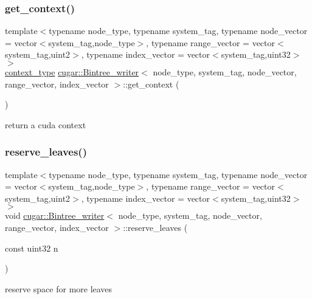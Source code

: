 \subsubsection{\texorpdfstring{get\+\_\+context()}{get\_context()}}
{\footnotesize\ttfamily template$<$typename node\+\_\+type, typename system\+\_\+tag, typename node\+\_\+vector = vector$<$system\+\_\+tag,node\+\_\+type$>$, typename range\+\_\+vector = vector$<$system\+\_\+tag,uint2$>$, typename index\+\_\+vector = vector$<$system\+\_\+tag,uint32$>$$>$ \\
\hyperlink{structcugar_1_1_bintree__writer__context}{context\+\_\+type} \hyperlink{structcugar_1_1_bintree__writer}{cugar\+::\+Bintree\+\_\+writer}$<$ node\+\_\+type, system\+\_\+tag, node\+\_\+vector, range\+\_\+vector, index\+\_\+vector $>$\+::get\+\_\+context (\begin{DoxyParamCaption}{ }\end{DoxyParamCaption})\hspace{0.3cm}{\ttfamily [inline]}}

return a cuda context \mbox{\label{structcugar_1_1_bintree__writer_aaff80118d0d6e4cc98e8decfedecd332}} 
\subsubsection{\texorpdfstring{reserve\+\_\+leaves()}{reserve\_leaves()}}
{\footnotesize\ttfamily template$<$typename node\+\_\+type, typename system\+\_\+tag, typename node\+\_\+vector = vector$<$system\+\_\+tag,node\+\_\+type$>$, typename range\+\_\+vector = vector$<$system\+\_\+tag,uint2$>$, typename index\+\_\+vector = vector$<$system\+\_\+tag,uint32$>$$>$ \\
void \hyperlink{structcugar_1_1_bintree__writer}{cugar\+::\+Bintree\+\_\+writer}$<$ node\+\_\+type, system\+\_\+tag, node\+\_\+vector, range\+\_\+vector, index\+\_\+vector $>$\+::reserve\+\_\+leaves (\begin{DoxyParamCaption}\item[{const uint32}]{n }\end{DoxyParamCaption})\hspace{0.3cm}{\ttfamily [inline]}}

reserve space for more leaves


